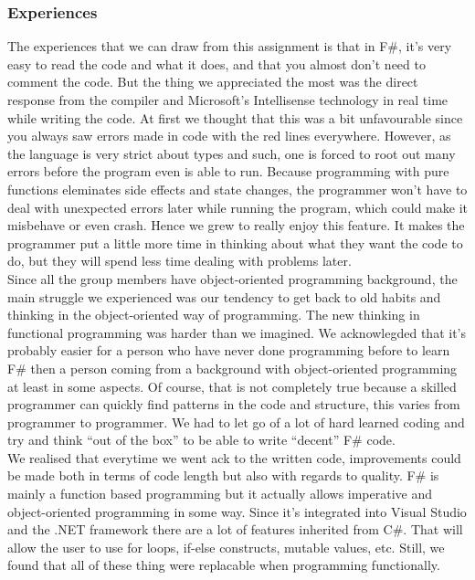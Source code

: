 \documentclass[12pt, a4paper]{article}
\begin{document}
\subsubsection{Experiences}
The experiences that we can draw from this assignment is that in F\#, it’s very easy to read the code and what it does, and that you almost don’t need to comment the code. But the thing we appreciated the most was the direct response from the compiler and Microsoft’s Intellisense technology in real time while writing the code. At first we thought that this was a bit unfavourable since you always saw errors made in code with the red lines everywhere. However, as the language is very strict about types and such, one is forced to root out many errors before the program even is able to run. Because programming with pure functions eleminates side effects and state changes, the programmer won't have to deal with unexpected errors later while running the program, which could make it misbehave or even crash. Hence we grew to really enjoy this feature. It makes the programmer put a little more time in thinking about what they want the code to do, but they will spend less time dealing with problems later.\\

Since all the group members have object-oriented programming background, the main struggle we experienced was our tendency to get back to old habits and thinking in the object-oriented way of programming. The new thinking in functional programming was harder than we imagined. We acknowlegded that it’s probably easier for a person who have never done programming before to learn F\# then a person coming from a background with object-oriented programming at least in some aspects. Of course, that is not completely true because a skilled programmer can quickly find patterns in the code and structure, this varies from programmer to programmer. We had to let go of a lot of hard learned coding and try and think “out of the box” to be able to write “decent” F\# code.\\

We realised that everytime we went ack to the written code, improvements could be made both in terms of code length but also with regards to quality. F\# is mainly a function based programming but it actually allows imperative and object-oriented programming in some way. Since it’s integrated into Visual Studio and the .NET framework there are a lot of features inherited from C\#. That will allow the user to use for loops, if-else constructs, mutable values, etc. Still, we found that all of these thing were replacable when programming functionally.\\
\end{document}
